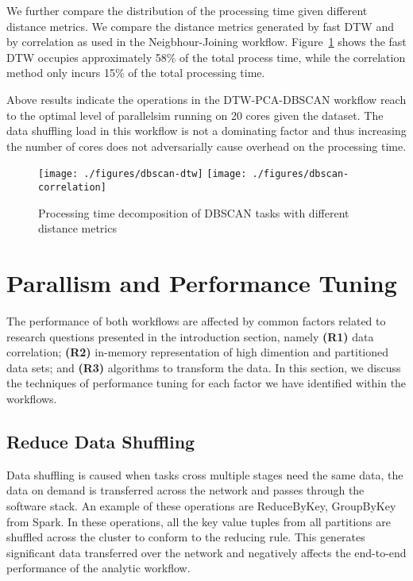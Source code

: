 We further compare the distribution of the processing time given different distance metrics. We compare the distance metrics generated by fast DTW and by correlation as used in the Neigbhour-Joining workflow. Figure~\ref{Fig:dbscan-decomposition} shows the fast DTW occupies approximately 58\% of the total process time, while the correlation method only incurs 15\% of the total processing time. 

Above results indicate the operations in the DTW-PCA-DBSCAN workflow reach to the optimal level of parallelsim running on 20 cores given the dataset. The data shuffling load in this workflow is not a dominating factor and thus increasing the number of cores does not adversarially cause overhead on the processing time. 


\begin{figure}
	\centering
	\texttt{[image: ./figures/dbscan-dtw]}
	\texttt{[image: ./figures/dbscan-correlation]}
	\caption{Processing time decomposition of DBSCAN tasks with different distance metrics}
	\label{Fig:dbscan-decomposition}
\end{figure}


\section{Parallism and Performance Tuning}


The performance of both workflows are affected by common factors related to research questions presented in the introduction section, namely \textbf{(R1)} data correlation; \textbf{(R2)} in-memory representation of high dimention and partitioned data sets; and \textbf{(R3)} algorithms to transform the data. In this section, we discuss the techniques of performance tuning for each factor we have identified within the workflows. 


\subsection{Reduce Data Shuffling}
Data shuffling is caused when tasks cross multiple stages need the same  data, the data on demand is transferred across the network and passes through the software stack. An example of these operations are \textsf{ReduceByKey}, \textsf{GroupByKey} from Spark. In these operations, all the key value tuples from all partitions are shuffled across the cluster to conform to the reducing rule. This generates significant data transferred over the network and negatively affects the end-to-end performance of the analytic workflow.

